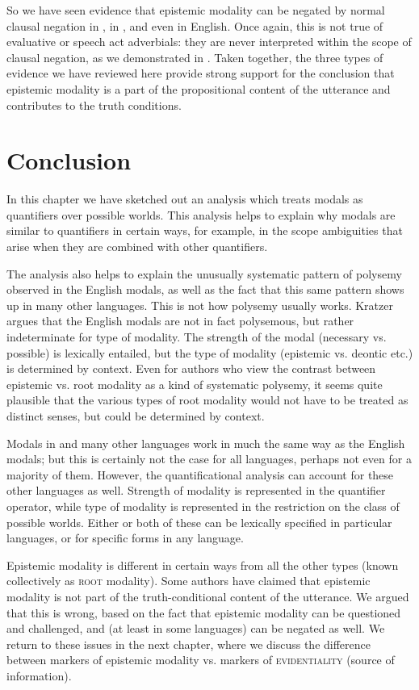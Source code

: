 So we have seen evidence that epistemic modality can be negated by normal clausal negation in , in , and even in English. Once again, this is not true of evaluative or speech act adverbials: they are never interpreted within the scope of clausal negation, as we demonstrated in . Taken together, the three types of evidence we have reviewed here provide strong support for the conclusion that epistemic modality is a part of the propositional content of the utterance and contributes to the truth conditions.


\section{Conclusion}\label{sec:16.6}
\largerpage 
In this chapter we have sketched out an analysis which treats modals as quantifiers over possible worlds. This analysis helps to explain why modals are similar to quantifiers in certain ways, for example, in the scope ambiguities that arise when they are combined with other quantifiers.



The analysis also helps to explain the unusually systematic pattern of polysemy observed in the English modals, as well as the fact that this same pattern shows up in many other languages. This is not how polysemy usually works. Kratzer argues that the English modals are not in fact polysemous, but rather indeterminate for type of modality. The strength of the modal (necessary vs. possible) is lexically entailed, but the type of modality (epistemic vs. deontic etc.) is determined by context. Even for authors who view the contrast between epistemic vs. root modality as a kind of systematic polysemy, it seems quite plausible that the various types of root modality would not have to be treated as distinct senses, but could be determined by context.


Modals in  and many other languages work in much the same way as the English modals; but this is certainly not the case for all languages, perhaps not even for a majority of them. However, the quantificational analysis can account for these other languages as well. Strength of modality is represented in the quantifier operator, while type of modality is represented in the restriction on the class of possible worlds. Either or both of these can be lexically specified in particular languages, or for specific forms in any language.



Epistemic modality is different in certain ways from all the other types (known collectively as \textsc{root} modality). Some authors have claimed that epistemic modality is not part of the truth-conditional content of the utterance. We argued that this is wrong, based on the fact that epistemic modality can be questioned and challenged, and (at least in some languages) can be negated as well. We return to these issues in the next chapter, where we discuss the difference between markers of epistemic modality vs. markers of \textsc{evidentiality} (source of information).



